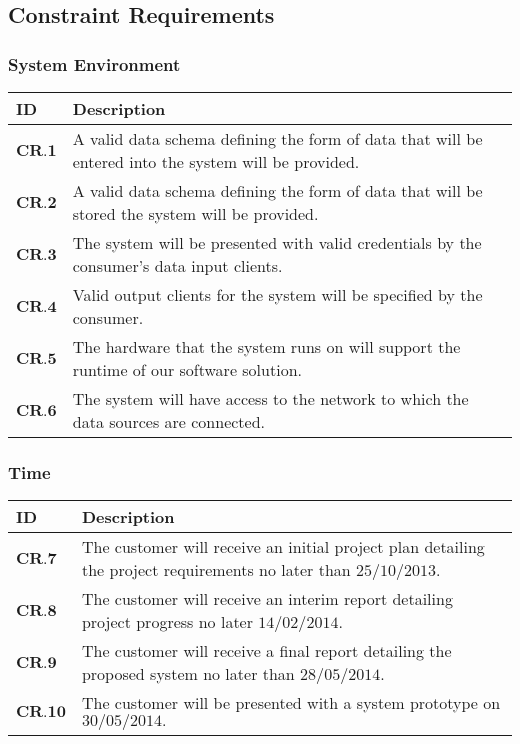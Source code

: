 \subsection{Constraint Requirements}
\subsubsection{System Environment}
\begin{longtable}[H]{| p{1.2cm} | p{15.3cm} |}
		\hline
		\cellcolor{titleColor}\textbf{ID}		&	\cellcolor{titleColor}\textbf{Description}	\\	\hline
		$\textbf{CR.1}$      &       A valid data schema defining the form of data that will be entered into the system will be provided.         \\ \hline
		$\textbf{CR.2}$      &       A valid data schema defining the form of data that will be stored the system will be provided.         \\ \hline
		$\textbf{CR.3}$     &       The system will be presented with valid credentials by the consumer’s data input clients.         \\ \hline
		$\textbf{CR.4}$    &       Valid output clients for the system will be specified by the consumer.         \\ \hline
		$\textbf{CR.5}$      &       The hardware that the system runs on will support the runtime of our software solution.         \\ \hline
		$\textbf{CR.6}$      &       The system will have access to the network to which the data sources are connected.         \\ \hline
\end{longtable}

\subsubsection{Time}
\begin{longtable}[H]{| p{1.2cm} | p{15.3cm} |}
		\hline
		\cellcolor{titleColor}\textbf{ID}		&	\cellcolor{titleColor}\textbf{Description}	\\	\hline
		$\textbf{CR.7} $     &       The customer will receive an initial project plan detailing the project requirements no later than $25/10/2013$.         \\ \hline
		$\textbf{CR.8}$     &       The customer will receive an interim report detailing project progress no later $14/02/2014$.         \\ \hline
		$\textbf{CR.9} $     &       The customer will receive a final report detailing the proposed system no later than $28/05/2014$.         \\ \hline
		$\textbf{CR.10}$      &       The customer will be presented with a system prototype on $30/05/2014.$         \\ \hline
\end{longtable}

